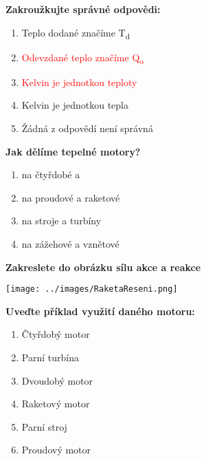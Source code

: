 \documentclass[../main.tex]{subfiles}
\begin{document}
\begin{enumerate}[label={\textbf{\arabic*.}}]
\begin{minipage}{0.45\textwidth}
    \item \textbf{Zakroužkujte správné odpovědi:}
        \begin{enumerate}[label={\alph*)}, itemsep=0pt, topsep=0.15cm]
            \item {Teplo dodané značíme T\textsubscript{d}}
            \item \textcolor{red}{{Odevzdané teplo značíme Q\textsubscript{o}}}
            \item \textcolor{red}{{Kelvin je jednotkou teploty}}
            \item {Kelvin je jednotkou tepla}
            \item {Žádná z odpovědí není správná}
        \end{enumerate}
    
    \item \textbf{Jak dělíme tepelné motory?}
        \begin{enumerate}[label={\alph*)}, itemsep=0pt, topsep=0.15cm]
            \item {}\tecky{2cm} na čtyřdobé a \tecky{2cm}
            \item {}\tecky{2cm} na proudové a raketové
            \item {}\tecky{2cm} na \tecky{1cm} stroje a \tecky{1cm} turbíny
            \item {}\tecky{2cm} na zážehové a vznětové
        \end{enumerate}
\end{minipage}
\hfill
\begin{minipage}[t]{0.4\textwidth}
    \vspace{-12.4cm}

    \item \textbf{Zakreslete do obrázku sílu akce a reakce}
        \begin{center}
            \texttt{[image: ../images/RaketaReseni.png]}
        \end{center}

    \item \textbf{Uveďte příklad využití daného motoru:}
    \begin{enumerate}[label={\arabic*.}, itemsep=0pt, topsep=0.15cm]
        \item {Čtyřdobý motor}\hfill{}\tecky{3.75cm}
        \item {Parní turbína}\hfill{}\tecky{3.75cm}
        \item {Dvoudobý motor}\hfill{}\tecky{3.75cm}
        \item {Raketový motor}\hfill{}\tecky{3.75cm}
        \item {Parní stroj}\hfill{}\tecky{3.75cm}
        \item {Proudový motor}\hfill{}\tecky{3.75cm}
    \end{enumerate}
    

\end{minipage}
\end{enumerate}
\end{document}
